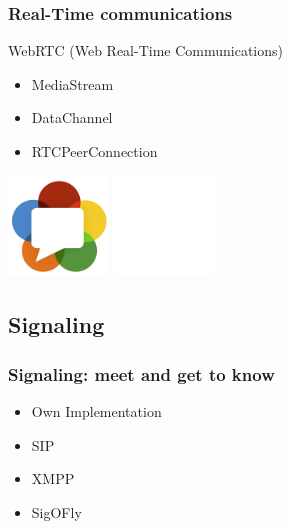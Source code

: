 \documentclass[compress]{beamer}
\begin{document}
		\begin{frame}[c]
		\frametitle{Real-Time communications}

		WebRTC (Web Real-Time Communications)

		\begin{itemize}
		\item MediaStream	
		\item DataChannel
		\item RTCPeerConnection
		\end{itemize}

		\begin{flushright}

			\vspace*{-5\baselineskip}
			\includegraphics[width=0.2\textwidth]{figures/webrtc.png}
			\includegraphics[width=0.2\textwidth]{figures/space.png}
		\end{flushright}
		
		\end{frame}



	\subsection{Signaling}
  		\begin{frame}[c]
		\frametitle{Signaling: meet and get to know}
		\begin{itemize}
		\item Own Implementation
		\vfill
		\item SIP
		\vfill
		\item XMPP
		\vfill
		\item SigOFly
		\end{itemize}
		\end{frame}
\end{document}
